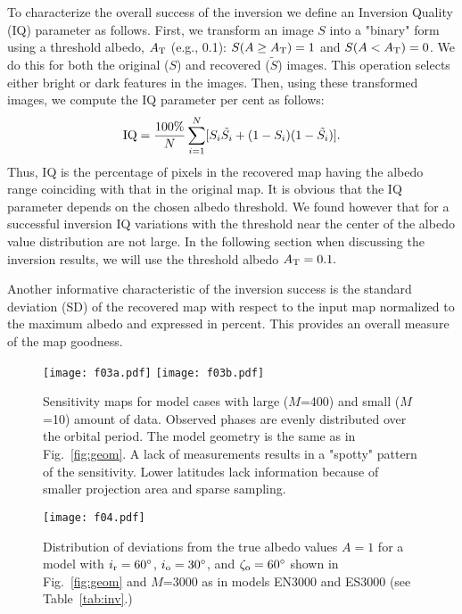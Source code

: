 \documentclass{emulateapj}
\begin{document}
To characterize the overall success of the inversion we define an
Inversion Quality (IQ) parameter as follows.
First, we transform an image $S$ into a "binary" form 
using a threshold albedo, $A_{\rm T}$ (e.g., 0.1): 
$S(A\ge A_{\rm T})=1$ and $S(A<A_{\rm T})=0$.
We do this for both the original ($S$) and recovered ($\tilde{S}$) images.
This operation selects either bright or dark features in the images.
Then, using these transformed images, we compute the IQ parameter per cent as follows:
\begin{equation}
{\rm IQ}=\frac{100\%}{N}\sum_{i=1}^{N}[S_i\tilde{S_i}+(1-S_i)(1-\tilde{S_i})].
\label{eq:iq}
\end{equation}
Thus, IQ is the percentage of pixels in the recovered map having the albedo
range coinciding with that in the original map.
It is obvious that the IQ parameter depends on the chosen albedo
threshold. We found however that for a successful inversion 
IQ variations with the threshold near the center of the albedo value distribution
are not large.
In the following section when discussing the inversion results, we will
use the threshold albedo $A_{\rm T}= 0.1.$ 

Another informative characteristic of the
inversion success is the standard deviation (SD) of the recovered
map with respect to the input map normalized to the maximum albedo
and expressed in percent. This provides an overall measure of the map
goodness.

\begin{figure}
\centering
\texttt{[image: f03a.pdf]}
\texttt{[image: f03b.pdf]}
\caption{Sensitivity maps for model cases with large ($M$=400) and small ($M$=10) amount of data. 
Observed phases are evenly distributed over the orbital period.
The model geometry is the same as in Fig.~\ref{fig:geom}. 
A lack of measurements results in a "spotty" pattern of the sensitivity. Lower latitudes lack
information because of smaller projection area and sparse sampling.}
\label{fig:inv_sen}
\end{figure}

\begin{figure}
\centering
\texttt{[image: f04.pdf]}
\caption{Distribution of deviations from the true albedo values $A=1$ for a model with
$i_{\rm r}=60^\circ$, $i_{\rm o}=30^\circ$, and $\zeta_{\rm o}=60^\circ$
shown in Fig.~\ref{fig:geom} and $M$=3000 as in models EN3000 and ES3000 (see Table~\ref{tab:inv}.) }
\label{fig:inv_dev}
\end{figure}
\end{document}
